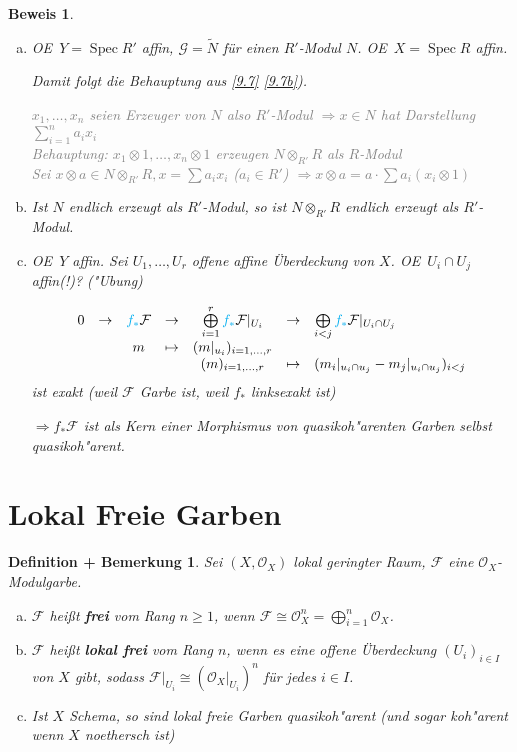 \documentclass[paper = A4, fontsize=12pt, numbers=noendperiod, chapterprefix=true]{scrbook}
\theoremstyle{break}
\newtheorem{DefBem}[Def]{Definition + Bemerkung}
\theoremstyle{nonumberbreak}
\newtheorem{bew}{Beweis}
\theoremstyle{nonumberplain}
\newcommand{\emp}[1]{\textbf{\emph{#1}}}
\newcommand{\defterm}[1]{{\index{#1}}\emp{#1}}
\newcommand{\deftermspec}[2]{{\index{#2}}\emp{#1}}
\newcommand{\Sum}{\sum\limits}
\DeclareMathOperator{\Spec}{Spec}
\newcommand{\calF}{\mathcal{F}}
\newcommand{\calG}{\mathcal{G}}
\newcommand{\calO}{\mathcal{O}}
\renewcommand{\OE}{O\!\!E~}
\begin{document}
\begin{bew}\begin{enumerate}[a)]
\item
	\OE $Y = \Spec R'$ affin, $\calG = \tilde N$ f\"ur einen $R'$-Modul $N$. \OE $X = \Spec R$ affin.
	
	Damit folgt die Behauptung aus \ref{9.7} \ref{9.7b}).
	
	\textcolor{gray}{$x_1,\ldots ,x_n$ seien Erzeuger von $N$ also $R'$-Modul $\Rightarrow x \in N$ hat Darstellung $\Sum_{i=1}^n a_i x_i$\\
	\emph{Behauptung}: $x_1\otimes 1,\ldots ,x_n \otimes 1$ erzeugen $N \otimes_{R'} R$ als $R$-Modul\\
	Sei $x \otimes a \in N \otimes_{R'} R, x = \sum a_i x_i$ ($a_i \in R'$) $\Rightarrow x \otimes a = a \cdot \sum a_i (x_i \otimes 1)$}
\item
	Ist $N$ endlich erzeugt als $R'$-Modul, so ist $N \otimes_{R'} R$ endlich erzeugt als $R'$-Modul.
\item
	\OE $Y$ affin. Sei $U_1,\ldots ,U_r$ offene affine \"Uberdeckung von $X$. \OE $U_i \cap U_j$ affin(!)? ("Ubung)
	
	\[\begin{array}{ccccccl} 0 &\to& \textcolor{color1}{f_*}\calF &\to& \bigoplus\limits_{i=1}^r \textcolor{color1}{f_*}\calF|_{U_i} &\to& \bigoplus\limits_{i < j} \textcolor{color1}{f_*}\calF|_{U_i \cap U_j} \\
		&& m &\mapsto& (m|_{u_i})_{i=1,\ldots ,r} && \\
		&&&& (m)_{i=1,\ldots ,r} &\mapsto& (m_i|_{u_i \cap u_j} - m_j|_{u_i \cap u_j})_{i<j}\end{array}\]
	ist exakt (weil $\calF$ Garbe ist, \textcolor{color1}{weil $f_*$ linksexakt ist})
	
	$\Rightarrow f_*\calF$ ist als Kern einer Morphismus von quasikoh"arenten Garben selbst quasikoh"arent.
\end{enumerate}\end{bew}

\newpage

\section{Lokal Freie Garben}

\begin{DefBem}
Sei $(X, \calO_X)$ lokal geringter Raum, $\calF$ eine $\calO_X$-Modulgarbe.
\begin{enumerate}[a)]
\item
	$\calF$ hei\ss t \defterm{frei} vom Rang $n \ge 1$, wenn $\calF \cong \calO_X^n = \bigoplus\limits_{i=1}^n \calO_X$.
\item
	$\calF$ hei\ss t \deftermspec{lokal frei}{frei!lokal} vom Rang $n$, wenn es eine offene \"Uberdeckung $(U_i)_{i\in I}$ von $X$ gibt, sodass $\calF|_{U_i} \cong (\calO_X|_{U_i})^n$ f\"ur jedes $i \in I$.
\item
	Ist $X$ Schema, so sind lokal freie Garben quasikoh"arent (und sogar koh"arent wenn $X$ noethersch ist)
\end{enumerate}\end{DefBem}
\end{document}
